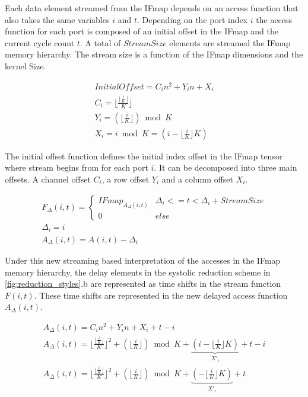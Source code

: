 Each data element streamed from the IFmap depends on an access function that
also takes the same variables $i$ and $t$. Depending on the port index $i$ the
access function for each port is composed of an initial offset in the IFmap and
the current cycle count $t$. A total of $StreamSize$ elements are streamed the IFmap
memory hierarchy. The stream size is a function of the IFmap dimensions
and the kernel Size. 

\begin{gather}
    InitialOffset = C_in^2+Y_in+X_i \\
    C_i = \lfloor \frac{\lfloor \frac{i}{K} \rfloor}{K} \rfloor \\
    Y_i = (\lfloor \frac{i}{K} \rfloor ) \bmod K\\
    X_i = i \bmod K = (i - \lfloor \frac{i}{K} \rfloor K)
\end{gather}

The initial offset function defines the initial index
offset in the IFmap tensor where stream begins from for each port $i$. It can be
decomposed into three main offsets. A channel offset $C_i$, a row offset $Y_i$
and a column offset $X_i$. 

\begin{gather}
    F_\Delta(i, t) = \begin{cases}
    IFmap_{A_\Delta(i, t)} & \Delta_i<=t < \Delta_i+ StreamSize \\
    0 & else
    \end{cases} \\
    \Delta_i = i \\
    A_\Delta(i,t) = A(i, t) - \Delta_i
\end{gather}

Under this new streaming based interpretation of the accesses in the IFmap
memory hierarchy, the delay elements in the systolic reduction scheme in
\autoref{fig:reduction_styles}.b are represented as time shifts in the stream
function $F(i,t)$. These time shifts are represented in the new delayed access
function $A_\Delta(i, t)$.

\begin{gather}
    A_\Delta(i,t) =  C_in^2+Y_in+X_i + t- i\\
    A_\Delta(i,t) =  \lfloor \frac{\lfloor \frac{i}{K} \rfloor}{K} \rfloor^2+(\lfloor \frac{i}{K} \rfloor ) \bmod K + \underbrace{(i - \lfloor \frac{i}{K} \rfloor K)}_{X'_i} + t - i\\
    A_\Delta(i,t) =  \lfloor \frac{\lfloor \frac{i}{K} \rfloor}{K} \rfloor^2+(\lfloor \frac{i}{K} \rfloor ) \bmod K + \underbrace{(- \lfloor \frac{i}{K} \rfloor K)}_{X'_i} + t\\
\end{gather}

